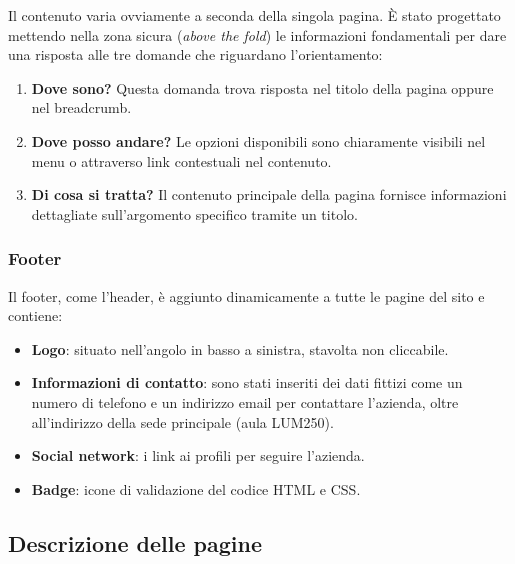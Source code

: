 \documentclass[a4paper, 12pt]{article}
\begin{document}
\begin{justify}
Il contenuto varia ovviamente a seconda della singola pagina. È stato progettato mettendo nella zona sicura (\textit{above the fold}) le informazioni fondamentali per dare una risposta alle tre domande che riguardano l'orientamento:
\begin{enumerate}
    \item \textbf{Dove sono?} Questa domanda trova risposta nel titolo della pagina oppure nel breadcrumb.
    \item \textbf{Dove posso andare?} Le opzioni disponibili sono chiaramente visibili nel menu o attraverso link contestuali nel contenuto.
    \item \textbf{Di cosa si tratta?} Il contenuto principale della pagina fornisce informazioni dettagliate sull'argomento specifico tramite un titolo.
\end{enumerate}

\subsubsection{Footer}

Il footer, come l'header, è aggiunto dinamicamente a tutte le pagine del sito e contiene:
\begin{itemize}
    \item \textbf{Logo}: situato nell'angolo in basso a sinistra, stavolta non cliccabile.
    \item \textbf{Informazioni di contatto}: sono stati inseriti dei dati fittizi come un numero di telefono e un indirizzo email per contattare l'azienda, oltre all'indirizzo della sede principale (aula LUM250).
    \item \textbf{Social network}: i link ai profili per seguire l'azienda.
    \item \textbf{Badge}: icone di validazione del codice HTML e CSS.
\end{itemize}

\subsection{Descrizione delle pagine}


\end{justify}
\end{document}
